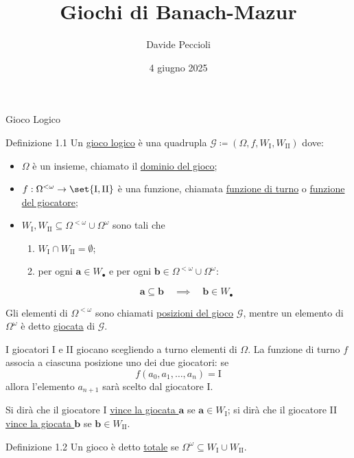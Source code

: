 \documentclass[babel]{beamer}
\institute[]{Università degli Studi di Torino}
\author{Davide Peccioli}
\date{4 giugno 2025}
\title{Giochi di Banach-Mazur}
\renewcommand{\href}[2]{#2}
\begin{document}
\maketitle

\begin{frame}[label={sec:orgc28c64b}]{Gioco Logico}
\begin{block}{Definizione 1.1}
Un \uline{gioco logico} è una quadrupla \(\mathcal{G} \coloneqq (\Omega, f, W_{\text{I}}, W_{\text{II}})\) dove:
\begin{itemize}
\item \(\Omega\) è un \href{../../../../../../../org/roam/20250130104331-insieme_mk.org}{insieme}, chiamato il \uline{dominio del gioco};
\item \(f:\Omega^{<\omega}\to \set{\text{I},\text{II}}\) è una \href{../../../../../../../org/roam/20250202170607-classe_relazione_binaria.org}{funzione}, chiamata \uline{funzione di turno} o \uline{funzione del giocatore};
\item \(W_{\text{I}},W_{\text{II}} \subseteq \Omega^{<\omega}\cup \Omega^{\omega}\) sono tali che
\begin{enumerate}
\item \(W_{\text{I}}\cap W_{\text{II}} = \emptyset\);
\item per ogni \(\bm{a} \in W_{\bullet}\) e per ogni \(\bm{b} \in\Omega^{<\omega}\cup \Omega^{\omega}\):
\end{enumerate}
\begin{equation*}
  \bm{a} \subseteq \bm{b}\quad\implies\quad \bm{b} \in W_{\bullet}
\end{equation*}
\end{itemize}

Gli elementi di \(\Omega^{<\omega}\) sono chiamati \uline{posizioni del gioco} \(\mathcal{G}\), mentre un elemento di \(\Omega^{\omega}\) è detto \uline{giocata} di \(\mathcal{G}\).
\end{block}
\end{frame}
\begin{frame}[label={sec:orga493e04}]
I giocatori I e II giocano scegliendo a turno elementi di \(\Omega\). La funzione di turno \(f\) associa a ciascuna posizione uno dei due giocatori: se
\begin{equation*}
f(a_{0},a_{1},\dots,a_{n}) = \text{I}
\end{equation*}
allora l'elemento \(a_{n+1}\) sarà scelto dal giocatore I.

Si dirà che il giocatore I \uline{vince la giocata \(\bm{a}\)} se \(\bm{a} \in W_{\text{I}}\); si dirà che il giocatore II \uline{vince la giocata \(\bm{b}\)} se \(\bm{b} \in W_{\text{II}}\).
\begin{block}{Definizione 1.2}
Un gioco è detto \uline{totale} se \(\Omega^{\omega} \subseteq W_{\text{I}}\cup W_{\text{II}}\).
\end{block}
\end{frame}
\end{document}

